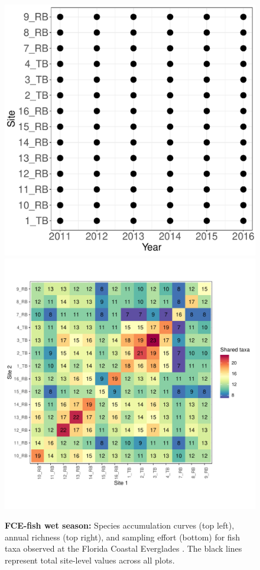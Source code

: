 \documentclass[11pt, oneside]{article}
\begin{document}
\begin{figure}[h!]
\includegraphics[scale = 0.4]{fce-fish-RehageWet_spatiotemporal_sampling_effort.pdf}
\includegraphics[scale = 0.4]{fce-fish-RehageWet_spp_shared.pdf}
\caption{{\bf FCE-fish wet season:} Species accumulation curves (top left),  annual richness (top right), and sampling effort (bottom)  for fish taxa observed at the Florida Coastal Everglades . The black lines represent total site-level values across all plots.}
\label{fce-fish-wet}
\end{figure}
\end{document}
